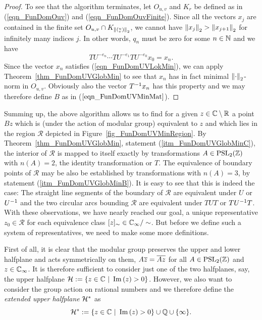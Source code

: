 \begin{proof}
To see that the algorithm terminates, let $O_{u,v}$ and $K_r$ be defined as in (\ref{eqn_FunDomOuv}) and (\ref{eqn_FunDomOuvFinite}). Since all the vectors $x_j$ are contained in the finite set $O_{u,v} \cap K_{\left\| ({}^u_v) \right\|_2}$, we cannot have $\left\| x_j \right\|_2 > \left\| x_{j+1} \right\|_2$ for infinitely many indices $j$. In other words, $q_n$ must be zero for some $n \in \mathbb{N}$ and we have
\begin{equation*}
TU^{-e_n} \cdots TU^{-e_1} TU^{-e_0} x_0 = x_n.
\end{equation*}
Since the vector $x_n$ satisfies (\ref{eqn_FunDomUVLokMin}), we can apply Theorem~\ref{thm_FunDomUVGlobMin} to see that $x_n$ has in fact minimal $\left\| \cdot \right\|_2$-norm in $O_{u,v}$. Obviously also the vector ${T}^{-1}x_n$ has this property and we may therefore define $B$ as in ($\ref{eqn_FunDomUVMinMat}$).
\end{proof}

Summing up, the above algorithm allows us to find for a given $z \in \mathbb{C} \setminus \mathbb{R}$ a point $Bz$ which is (under the action of modular group) equivalent to $z$  and which lies in the region $\mathcal{R}$ depicted in Figure~{\ref{fig_FunDomUVMinRegion}}. By Theorem~\ref{thm_FunDomUVGlobMin}, statement (\ref{itm_FunDomUVGlobMinC}), the interior of $\mathcal{R}$ is mapped to itself exactly by transformations $A \in \operatorname{PSL}_{2}(\mathbb{Z})$ with $n(A) = 2$, \ie the identity transformation or $T$. The equivalence of boundary points of $\mathcal{R}$ may be also be established by transformations with $n(A) = 3$, by statement (\ref{itm_FunDomUVGlobMinB}). It is easy to see that this is indeed the case: The straight line segments of the boundary of $\mathcal{R}$ are equivalent under $U$ or ${U}^{-1}$ and the two circular arcs bounding $\mathcal{R}$ are equivalent under $TUT$ or $T{U}^{-1}T$. With these observations, we have nearly reached our goal, a unique representative $z_0 \in \mathcal{R}$ for each equivalence class $[z]_\sim \in \mathbb{C}_{\infty}/\sim$. But before we define such a system of representatives, we need to make some more definitions.

First of all, it is clear that the modular group preserves the upper and lower halfplane and acts symmetrically on them, \ie $A\overline{z} = \overline{Az}$ for all $A \in \operatorname{PSL}_{2}(\mathbb{Z})$ and $z \in \mathbb{C}_{\infty}$. It is therefore sufficient to consider just one of the two halfplanes, say, the upper halfplane $\mathcal{H} := \{ z \in \mathbb{C} \ | \ \operatorname{Im}\left(z\right) > 0 \}$. However, we also want to consider the group action on rational numbers and we therefore define the \emph{extended upper halfplane} $\mathcal{H}^\ast$ as
\begin{equation}
\mathcal{H}^\ast := \{ z \in \mathbb{C} \ | \ \operatorname{Im}\left(z\right) > 0 \} \cup \mathbb{Q} \cup \{\infty\}.
\end{equation}

